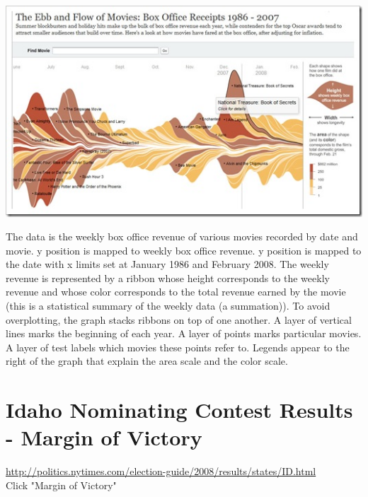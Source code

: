 \documentclass{article}
\begin{document}
  \includegraphics[width=1.0\textwidth]{plots/nytimesmoviebox.jpg} %

The data is the weekly box office revenue of various movies recorded by date and movie. y position is mapped to weekly box office revenue. y position is mapped to the date with x limits set at January 1986 and February 2008. The weekly revenue is represented by a ribbon whose height corresponds to the weekly revenue and whose color corresponds to the total revenue earned by the movie (this is a statistical summary of the weekly data (a summation)). To avoid overplotting, the graph stacks ribbons on top of one another. A layer of vertical lines marks the beginning of each year. A layer of points marks particular movies. A layer of test labels which movies these points refer to. Legends appear to the right of the graph that explain the area scale and the color scale.

\section{Idaho Nominating Contest Results - Margin of Victory}
\href{http://politics.nytimes.com/election-guide/2008/results/states/ID.html}{http://politics.nytimes.com/election-guide/2008/results/states/ID.html}\\
Click "Margin of Victory"
\end{document}
